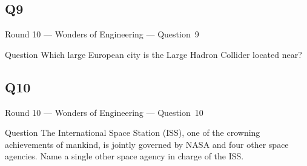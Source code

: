 \documentclass[11pt]{beamer}
\begin{document}
\subsection*{Q9}
\begin{frame}[t]{Round 10 --- Wonders of Engineering --- \mbox{Question 9}}
    \vspace{-0.5em}
    \begin{block}{Question}
        Which large European city is the Large Hadron Collider located near?
    \end{block}
\end{frame}
\subsection*{Q10}
\begin{frame}[t]{Round 10 --- Wonders of Engineering --- \mbox{Question 10}}
    \vspace{-0.5em}
    \begin{block}{Question}
        The International Space Station (ISS), one of the crowning achievements of mankind, is jointly governed by NASA and four other space agencies. Name a single other space agency in charge of the ISS.\@
    \end{block}
\end{frame}
\end{document}
